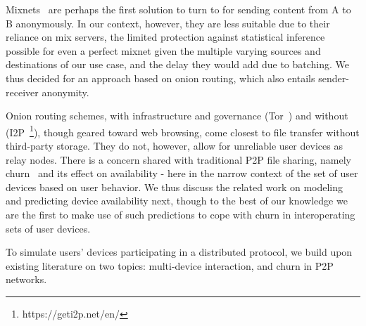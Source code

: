 Mixnets~\cite{Chaum:1981} are perhaps the first solution to turn to for sending content from A to B anonymously. In our context, however, they are less suitable due to their reliance on mix servers, the limited protection against statistical inference possible for even a perfect mixnet given the multiple varying sources and destinations of our use case, and the delay they would add due to batching. We thus decided for an approach based on onion routing, which also entails sender-receiver anonymity.

Onion routing schemes, with infrastructure and governance (Tor~\cite{Tor}) and without (I2P~\footnote{https://geti2p.net/en/}), though geared toward web browsing, come closest to file transfer without third-party storage. They do not, however, allow for unreliable user devices as relay nodes. 
There is a concern shared with traditional P2P file sharing, namely churn~\cite{dhtchurn} and its effect on availability - here in the narrow context of the set of user devices based on user behavior. We thus discuss the related work on modeling and predicting device availability next, though to the best of our knowledge we are the first to make use of such predictions to cope with churn in interoperating sets of user devices. 


To simulate users' devices participating in a distributed protocol, we build upon existing literature on two topics: 
multi-device interaction, and churn in P2P networks. 

